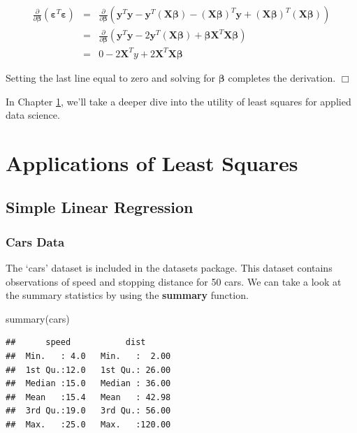 \documentclass[
]{article}
\newenvironment{Shaded}{\begin{snugshade}}{\end{snugshade}}
\newcommand{\FunctionTok}[1]{\textcolor[rgb]{0.00,0.00,0.00}{#1}}
\newcommand{\NormalTok}[1]{#1}
\theoremstyle{definition}
\theoremstyle{definition}
\theoremstyle{definition}
\theoremstyle{definition}
\theoremstyle{remark}
\begin{document}
\begin{eqnarray*}
\frac{\partial}{\partial \boldsymbol \beta} \left(\boldsymbol \varepsilon^T \boldsymbol \varepsilon\right) 
&=&
\frac{\partial}{\partial \boldsymbol \beta} \left(\mathbf{y}^T\mathbf{y} - \mathbf{y}^T(\mathbf{X}\boldsymbol \beta) - (\mathbf{X}\boldsymbol \beta)^T\mathbf{y} + (\mathbf{X}\boldsymbol \beta)^T(\mathbf{X}\boldsymbol \beta)\right)\\
&=&
\frac{\partial}{\partial \boldsymbol \beta} \left(\mathbf{y}^T\mathbf{y} -2\mathbf{y}^T(\mathbf{X}\boldsymbol \beta) + \boldsymbol \beta\mathbf{X}^T\mathbf{X}  \boldsymbol \beta \right)\\
&=& 0 - 2\mathbf{X}^Ty + 2\mathbf{X}^T\mathbf{X}\boldsymbol \beta
\end{eqnarray*}

Setting the last line equal to zero and solving for \(\boldsymbol \beta\) completes the derivation. \(\Box\)

In Chapter \ref{lsapp}, we'll take a deeper dive into the utility of least squares for applied data science.

\hypertarget{lsapp}{%
\section{Applications of Least Squares}\label{lsapp}}

\hypertarget{simple-linear-regression}{%
\subsection{Simple Linear Regression}\label{simple-linear-regression}}

\hypertarget{cars-data}{%
\subsubsection{Cars Data}\label{cars-data}}

The `cars' dataset is included in the datasets package. This dataset contains observations of speed and stopping distance for 50 cars. We can take a look at the summary statistics by using the \textbf{summary} function.

\begin{Shaded}
\begin{Highlighting}[]
\FunctionTok{summary}\NormalTok{(cars)}
\end{Highlighting}
\end{Shaded}

\begin{verbatim}
##      speed           dist       
##  Min.   : 4.0   Min.   :  2.00  
##  1st Qu.:12.0   1st Qu.: 26.00  
##  Median :15.0   Median : 36.00  
##  Mean   :15.4   Mean   : 42.98  
##  3rd Qu.:19.0   3rd Qu.: 56.00  
##  Max.   :25.0   Max.   :120.00
\end{verbatim}
\end{document}
